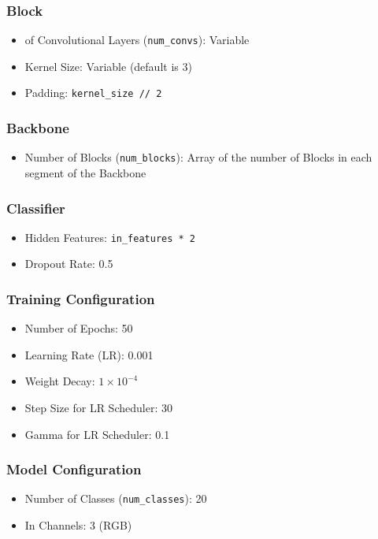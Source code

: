 \documentclass[12pt]{article}
\begin{document}
\begin{multicols}{2}
\subsubsection*{Block}

\begin{itemize}
  \item \textnumero \xspace of Convolutional Layers (\texttt{num\_convs}): Variable
  \item Kernel Size: Variable (default is 3)
  \item Padding: \texttt{kernel\_size // 2}
\end{itemize}

\subsubsection*{Backbone}

\begin{itemize}
  \item Number of Blocks (\texttt{num\_blocks}): Array of the number of Blocks in each segment of the Backbone
\end{itemize}

\subsubsection*{Classifier}

\begin{itemize}
  \item Hidden Features: \texttt{in\_features * 2}
  \item Dropout Rate: 0.5
\end{itemize}

\subsubsection*{Training Configuration}

\begin{itemize}
  \item Number of Epochs: 50
  \item Learning Rate (LR): 0.001
  \item Weight Decay: $1 \times 10^{-4}$
  \item Step Size for LR Scheduler: 30
  \item Gamma for LR Scheduler: 0.1
\end{itemize}

\subsubsection*{Model Configuration}

\begin{itemize}
  \item Number of Classes (\texttt{num\_classes}): 20
  \item In Channels: 3 (RGB)
\end{itemize}
\end{multicols}
\fontsize{12}{12}\selectfont
\end{document}
